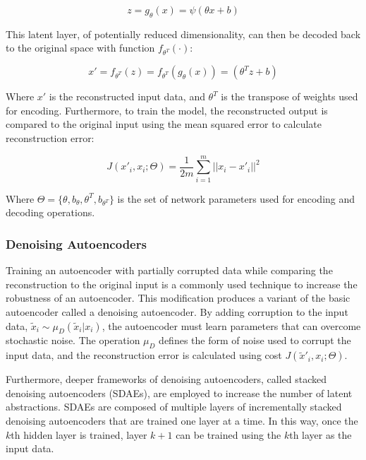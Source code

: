 \begin{equation}
z = g_{\theta}(x) = \psi(\theta x + b)
\end{equation}

This latent layer, of potentially reduced dimensionality, can then be decoded back to the original space with function $f_{\theta^{T}}(\cdot)$:

\begin{equation}
x' = f_{\theta^{T}}(z) =  f_{\theta^{T}}(g_{\theta}(x)) = (\theta^{T}z + b)
\end{equation}

Where $x'$ is the reconstructed input data, and $\theta^{T}$ is the transpose of weights used for encoding. Furthermore, to train the model, the reconstructed output is compared to the original input using the mean squared error to calculate reconstruction error:

\begin{equation}
J(x'_{i},x_{i};\Theta) = \frac{1}{2m}{\sum^{m}_{i=1}} ||x_i - x'_i||^2
\end{equation}

Where $\Theta = \{\theta, b_\theta,\theta^{T}, b_{\theta^{T}}\}$ is the set of network parameters used for encoding and decoding operations. 

\subsubsection{Denoising Autoencoders}
Training an autoencoder with partially corrupted data while comparing the reconstruction to the original input is a commonly used technique to increase the robustness of an autoencoder. This modification produces a variant of the basic autoencoder called a denoising autoencoder. By adding corruption to the input data, $\tilde{x}_{i} \sim \mu_{D}(\tilde{x}_{i}|x_{i})$, the autoencoder must learn parameters that can overcome stochastic noise. The operation $\mu_{D}$ defines the form of noise used to corrupt the input data, and the reconstruction error is calculated using cost $J(\tilde{x}'_{i},x_{i};\Theta)$. 

Furthermore, deeper frameworks of denoising autoencoders, called stacked denoising autoencoders (SDAEs), are employed to increase the number of latent abstractions. SDAEs are composed of multiple layers of incrementally stacked denoising autoencoders that are trained one layer at a time. In this way, once the $k$th hidden layer is trained, layer $k+1$ can be trained using the $k$th layer as the input data.

